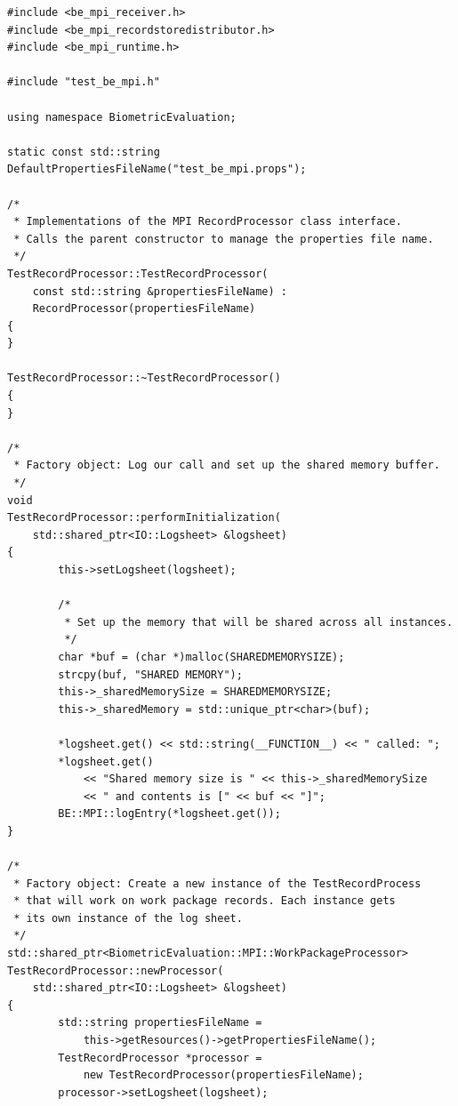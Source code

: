 \begin{lstlisting}[caption={MPI Framework Application Implementation}, label=lst:mpiappimpl]
#include <be_mpi_receiver.h>
#include <be_mpi_recordstoredistributor.h>
#include <be_mpi_runtime.h>

#include "test_be_mpi.h"

using namespace BiometricEvaluation;

static const std::string DefaultPropertiesFileName("test_be_mpi.props");

/*
 * Implementations of the MPI RecordProcessor class interface.
 * Calls the parent constructor to manage the properties file name.
 */
TestRecordProcessor::TestRecordProcessor(
    const std::string &propertiesFileName) :
    RecordProcessor(propertiesFileName)
{
}

TestRecordProcessor::~TestRecordProcessor()
{
}

/*
 * Factory object: Log our call and set up the shared memory buffer.
 */
void
TestRecordProcessor::performInitialization(
    std::shared_ptr<IO::Logsheet> &logsheet)
{
        this->setLogsheet(logsheet);

        /*
         * Set up the memory that will be shared across all instances.
         */
        char *buf = (char *)malloc(SHAREDMEMORYSIZE);
        strcpy(buf, "SHARED MEMORY");
        this->_sharedMemorySize = SHAREDMEMORYSIZE;
        this->_sharedMemory = std::unique_ptr<char>(buf);

        *logsheet.get() << std::string(__FUNCTION__) << " called: ";
        *logsheet.get()
            << "Shared memory size is " << this->_sharedMemorySize
            << " and contents is [" << buf << "]";
        BE::MPI::logEntry(*logsheet.get());
}

/*
 * Factory object: Create a new instance of the TestRecordProcess
 * that will work on work package records. Each instance gets
 * its own instance of the log sheet.
 */
std::shared_ptr<BiometricEvaluation::MPI::WorkPackageProcessor>
TestRecordProcessor::newProcessor(
    std::shared_ptr<IO::Logsheet> &logsheet)
{
        std::string propertiesFileName =
            this->getResources()->getPropertiesFileName();
        TestRecordProcessor *processor =
            new TestRecordProcessor(propertiesFileName);
        processor->setLogsheet(logsheet);


\end{lstlisting}
